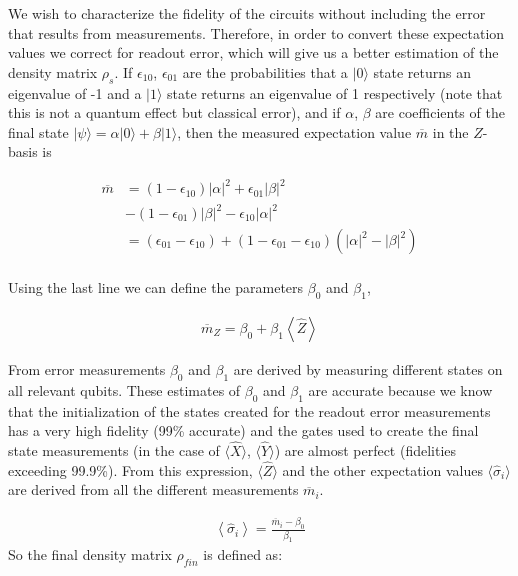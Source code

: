 We wish to characterize the fidelity of the circuits without including the error
that results from measurements. Therefore, in order to convert these expectation values we correct for
readout error, which will give us a better estimation of the density matrix
$\rho_s$. If $\epsilon_{10}$, $\epsilon_{01}$ are the probabilities that a
$|0\rangle$ state returns an eigenvalue of -1 and a
$|1\rangle$ state returns an eigenvalue of 1 respectively (note that this
is not a quantum effect but classical error), and if $\alpha$, $\beta$ are
coefficients of the final state
$|\psi\rangle=\alpha|0\rangle+\beta|1\rangle$,
then the measured expectation value $\overline{m}$ in the $Z$-basis is

\begin{align*}
  \overline{m} &=\left(1-\epsilon_{10}\right)\left|\alpha\right|^2+\epsilon_{01}\left|\beta\right|^2\\
&-\left(1-\epsilon_{01}\right)\left|\beta\right|^2
-\epsilon_{10}\left|\alpha\right|^2\\
&=\left(\epsilon_{01}-\epsilon_{10}\right)+\left(1-\epsilon_{01}-\epsilon_{10}\right)\left(\left|\alpha\right|^2-\left|\beta\right|^2\right)\\
\end{align*}

Using the last line we can define the parameters $\beta_0$ and $\beta_1$,

\begin{equation}
  \begin{split}
   \overline{m}_Z =\beta_0+\beta_1\left\langle \hat{Z}\right\rangle
\end{split}
\end{equation}

From error measurements $\beta_0$ and $\beta_1$ are derived by
measuring different states on all relevant qubits. These estimates of $\beta_0$
and $\beta_1$ are accurate because we know that the initialization of the states created for the readout error
measurements has a very high fidelity (99\% accurate) and the gates used to create the
final state measurements (in the case of $\langle \hat{X}\rangle$,
$\langle \hat{Y}\rangle$) are almost perfect (fidelities exceeding
99.9\%)\cite{ibmq_burlington,ibmq_16_melbourne,ibmq_yorktown}. From this
expression, $\langle \hat{Z}\rangle$ and the other expectation values
$\langle \hat{\sigma}_i\rangle$ are derived from all the different
measurements $\overline{m}_i$.

\begin{equation}
\begin{split} \left\langle
\hat{\sigma}_i\right\rangle=\frac{\overline{m}_i-\beta_0}{\beta_1}
\end{split}
\end{equation} So the final density matrix $\rho_{fin}$ is defined as:

